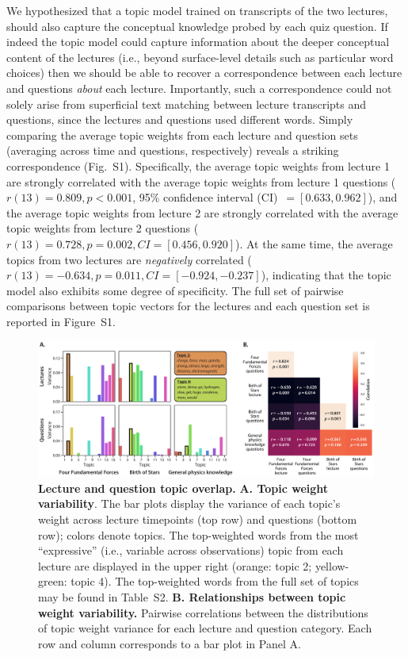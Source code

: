\documentclass[10pt]{article}
\newcommand{\topics}{S2}
\newcommand{\topicWeights}{S1}
\begin{document}
We hypothesized that a topic model trained on transcripts of the two lectures,
should also capture the conceptual knowledge probed by each quiz question. If
indeed the topic model could capture information about the deeper conceptual
content of the lectures (i.e., beyond surface-level details such as particular
word choices) then we should be able to recover a correspondence between each
lecture and questions \textit{about} each lecture. Importantly, such a
correspondence could not solely arise from superficial text matching between
lecture transcripts and questions, since the lectures and questions used
different words. Simply comparing the average topic weights from each lecture
and question sets (averaging across time and questions, respectively) reveals a
striking correspondence (Fig.~\topicWeights). Specifically, the average topic
weights from lecture 1 are strongly correlated with the average topic weights
from lecture 1 questions ($r(13) = 0.809, p < 0.001$, 95\% confidence interval
(CI)~$= [0.633, 0.962]$), and the average topic weights from lecture 2 are
strongly correlated with the average topic weights from lecture 2 questions
($r(13) = 0.728, p = 0.002, CI = [0.456, 0.920]$). At the same time, the
average topics from two lectures are \textit{negatively} correlated ($r(13) =
-0.634, p = 0.011, CI = [-0.924, -0.237]$), indicating that the topic model
also exhibits some degree of specificity. The full set of pairwise comparisons
between topic vectors for the lectures and each question set is reported in
Figure~\topicWeights.

\begin{figure}[tp]
    \centering
    \includegraphics[width=\textwidth]{figs/active-topics}

\caption{\textbf{Lecture and question topic overlap.} \textbf{A. Topic weight
variability}. The bar plots display the variance of each topic's weight across
lecture timepoints (top row) and questions (bottom row); colors denote topics.
The top-weighted words from the most ``expressive'' (i.e., variable across
observations) topic from each lecture are displayed in the upper right (orange:
topic 2; yellow-green: topic 4). The top-weighted words from the full set of
topics may be found in Table~\topics. \textbf{B. Relationships between topic
weight variability.} Pairwise correlations between the distributions of topic
weight variance for each lecture and question category. Each row and column
corresponds to a bar plot in Panel A.}

    \label{fig:topics}
\end{figure}
\end{document}
